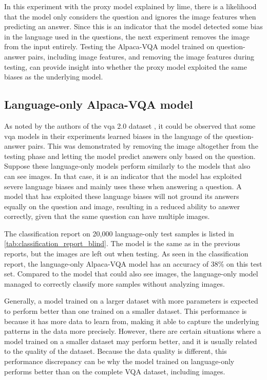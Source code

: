     In this experiment with the proxy model explained by \gls{lime}, there is a likelihood that the model only considers the question and ignores the image features when predicting an answer. Since this is an indicator that the model detected some bias in the language used in the questions, the next experiment removes the image from the input entirely. Testing the Alpaca-VQA model trained on question-answer pairs, including image features, and removing the image features during testing, can provide insight into whether the proxy model exploited the same biases as the underlying model.
    
    


    \subsection{Language-only Alpaca-VQA model}
    \label{sec4_language_only_model}
        
        As noted by the authors of the \gls{vqa} 2.0 dataset \cite{goyalMakingVQAMatter2017}, it could be observed that some \gls{vqa} models in their experiments learned biases in the language of the question-answer pairs. This was demonstrated by removing the image altogether from the testing phase and letting the model predict answers only based on the question. Suppose these language-only models perform similarly to the models that also can see images. In that case, it is an indicator that the model has exploited severe language biases and mainly uses these when answering a question. 
        A model that has exploited these language biases will not ground its answers equally on the question and image, resulting in a reduced ability to answer correctly, given that the same question can have multiple images.

        The classification report on 20,000 language-only test samples is listed in \autoref{tab:classification_report_blind}. The model is the same as in the previous reports, but the images are left out when testing.
        As seen in the classification report, the language-only Alpaca-VQA model has an accuracy of 38\% on this test set. Compared to the model that could also see images, the language-only model managed to correctly classify more samples without analyzing images.

        Generally, a model trained on a larger dataset with more parameters is expected to perform better than one trained on a smaller dataset. This performance is because it has more data to learn from, making it able to capture the underlying patterns in the data more precisely. 
        However, there are certain situations where a model trained on a smaller dataset may perform better, and it is usually related to the quality of the dataset. Because the data quality is different, this performance discrepancy can be why the model trained on language-only performs better than on the complete VQA dataset, including images. 
        
